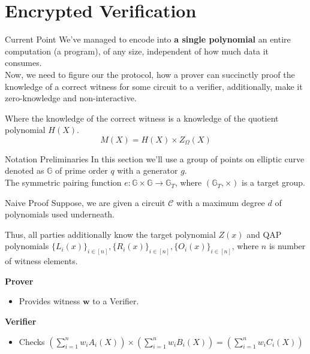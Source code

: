 \documentclass{zkdl-presentation-template}
\begin{document}
    \section{Encrypted Verification}

    \begin{frame}{Current Point}
        We've managed to encode into \textbf{a single polynomial} an entire computation (a program),
        of any size, independent of how much data it consumes. \\ \pause
        \vspace{10pt}
        Now, we need to figure our the protocol, how a prover can succinctly proof the knowledge of
        a correct witness for some circuit to a verifier, additionally, make it zero-knowledge and 
        non-interactive.\pause

        Where the knowledge of the correct witness is a knowledge of the quotient polynomial $H(X)$.
        \begin{equation*}
            M(X) = H(X) \times Z_{\Omega}(X)
        \end{equation*}
    \end{frame}

    \begin{frame}{Notation Preliminaries}
        In this section we'll use a group of points on elliptic curve denoted as $\mathbb{G}$ of
        prime order $q$ with a generator $g$.\\ \pause
        \vspace{5pt}
        The symmetric pairing function $e: \mathbb{G} \times \mathbb{G} \to \mathbb{G}_T$, where
        $(\mathbb{G}_T, \times)$ is a target group.
    \end{frame}

    \begin{frame}{Naive Proof}
        Suppose, we are given a circuit $\mathcal{C}$ with a maximum degree $d$ of polynomials
        used underneath.
        
        Thus, all parties additionally know the target polynomial $Z(x)$ and QAP polynomials 
        $\{L_i(x)\}_{i \in [n]}, \{R_i(x)\}_{i \in [n]}, \{O_i(x)\}_{i \in [n]}$, where $n$ is 
        number of witness elements.

        \pause
        \textbf{Prover}
        \vspace{-5pt}
        \begin{itemize}[label=]
            \item \vspace{-3pt} Provides witness $\boldsymbol{w}$ to a Verifier.
        \end{itemize}
        \pause
        \textbf{Verifier}
        \vspace{-5pt}
        \begin{itemize}[label=]
            \item \vspace{-3pt} Checks $\left( \sum_{i = 1}^{n} w_iA_i(X) \right) \times \left( \sum_{i = 1}^{n} w_iB_i(X) \right) = \left( \sum_{i = 1}^{n} w_iC_i(X) \right)$
        \end{itemize}
    \end{frame}
\end{document}
